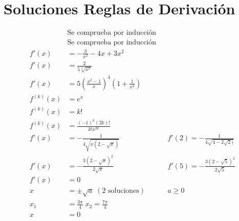 \documentclass[spanish,12pt]{article}
\begin{document}
\section{Soluciones Reglas de Derivación}
\begin{align*}
    &\text{Se comprueba por inducción}\\
    &\text{Se comprueba por inducción}\\
    f'(x)&=-\frac{3}{x^2}-4x+3x^2\\
    f'(x)&=\frac{2}{5\sqrt[5]{x^3}}\\
    f'(x)&=5\left(\frac{x^2-1}{x}\right)^4\left(1+\frac{1}{x^2}\right)\\
    f^{(k)}(x)&=e^x\\
    f^{(k)}(x)&=k!\\
    f^{(k)}(x)&=\frac{(-1)^k(2k)!}{k!x^{2k}}\\
    f'(x)&=-\frac{1}{4\sqrt{x(2-\sqrt{x})}} && f'(2)=-\frac{1}{4\sqrt{4-2\sqrt{2})}}\\
    f'(x)&=-\frac{3(2-\sqrt{x})^2}{2\sqrt{x}} && f'(5)=-\frac{3(2-\sqrt{5})^2}{2\sqrt{5}}\\
    f'(x)&=0\\
    x&=\pm\sqrt{a}\;(\text{2 soluciones}) && a\geq0\\
    x_1&=\frac{3\pi}{4}\;x_2=\frac{7\pi}{4}\\
    x&=0
\end{align*}
\end{document}
